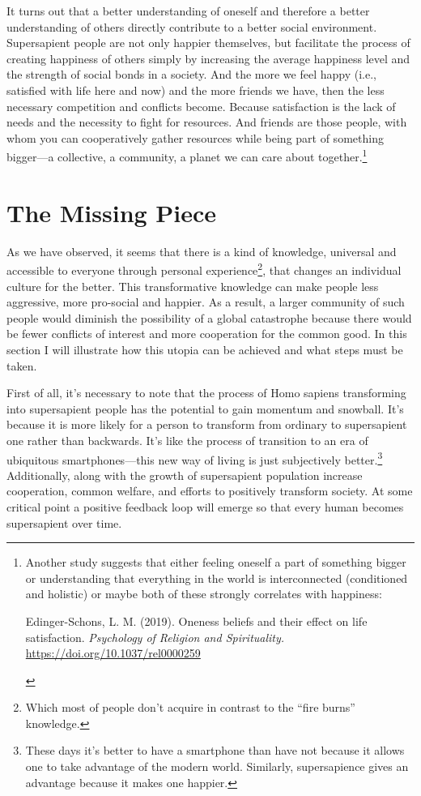 \documentclass[12pt]{report}
\begin{document}
\noindent It turns out that a better understanding of oneself and therefore a better understanding of others directly contribute to a better social environment. Supersapient people are not only happier themselves, but facilitate the process of creating happiness of others simply by increasing the average happiness level and the strength of social bonds in a society. And the more we feel happy (i.e., satisfied with life here and now) and the more friends we have, then the less necessary competition and conflicts become. Because satisfaction is the lack of needs and the necessity to fight for resources. And friends are those people, with whom you can cooperatively gather resources while being part of something bigger\thinspace---\thinspace a collective, a community, a planet we can care about together.\footnote{Another study suggests that either feeling oneself a part of something bigger or understanding that everything in the world is interconnected (conditioned and holistic) or maybe both of these strongly correlates with happiness:
\begin{compactitem}
  \item Edinger-Schons, L. M. (2019). Oneness beliefs and their effect on life satisfaction. \emph{Psychology of Religion and Spirituality.} \url{https://doi.org/10.1037/rel0000259}
\end{compactitem}\vspace{-1.3em}}

\section*{The Missing Piece}

As we have observed, it seems that there is a kind of knowledge, universal and accessible to everyone through personal experience\footnote{Which most of people don’t acquire in contrast to the ``fire burns'' knowledge.}, that changes an individual culture for the better. This transformative knowledge can make people less aggressive, more pro-social and happier. As a result, a larger community of such people would diminish the possibility of a global catastrophe because there would be fewer conflicts of interest and more cooperation for the common good. In this section I will illustrate how this utopia can be achieved and what steps must be taken.

\noindent First of all, it’s necessary to note that the process of Homo sapiens transforming into supersapient people has the potential to gain momentum and snowball. It’s because it is more likely for a person to transform from ordinary to supersapient one rather than backwards. It’s like the process of transition to an era of ubiquitous smartphones\thinspace---\thinspace this new way of living is just subjectively better.\footnote{These days it’s better to have a smartphone than have not because it allows one to take advantage of the modern world. Similarly, supersapience gives an advantage because it makes one happier.} Additionally, along with the growth of supersapient population increase cooperation, common welfare, and efforts to positively transform society. At some critical point a positive feedback loop will emerge so that every human becomes supersapient over time.
\end{document}
